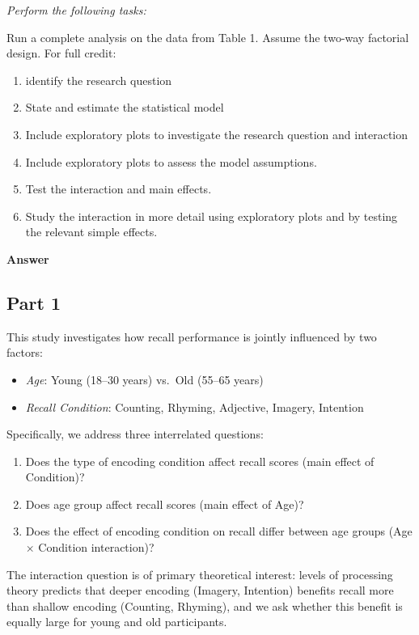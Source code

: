 \documentclass[letterpaper]{article}
\begin{document}
	\textit{Perform the following tasks:}
	
	Run a complete analysis on the data from Table 1. Assume the two-way factorial design. For full credit:
	
	\begin{enumerate}
		
		\item identify the research question
		\item State and estimate the statistical model
		\item Include exploratory plots to investigate the research question and interaction
		\item Include exploratory plots to assess the model assumptions.
		\item Test the interaction and main effects.
		\item Study the interaction in more detail using exploratory plots and by testing the relevant simple effects.
	\end{enumerate}
	
	\textbf{Answer}
	
	
	\subsection{Part 1}
	
	This study investigates how {recall performance} is jointly influenced by two factors:
	\begin{itemize}
		\item \textit{Age}: Young (18--30 years) vs.\ Old (55--65 years)
		\item \textit{Recall Condition}: Counting, Rhyming, Adjective, Imagery, Intention
	\end{itemize}
	
	Specifically, we address three interrelated questions:
	\begin{enumerate}
		\item Does the {type of encoding condition} affect recall scores (main effect of Condition)?
		\item Does {age group} affect recall scores (main effect of Age)?
		\item Does the effect of encoding condition on recall {differ between age groups} (Age $\times$ Condition interaction)?
	\end{enumerate}
	
	The interaction question is of primary theoretical interest: levels of processing theory predicts that deeper encoding (Imagery, Intention) benefits recall more than shallow encoding (Counting, Rhyming), and we ask whether this benefit is equally large for young and old participants.
	
\end{document}
